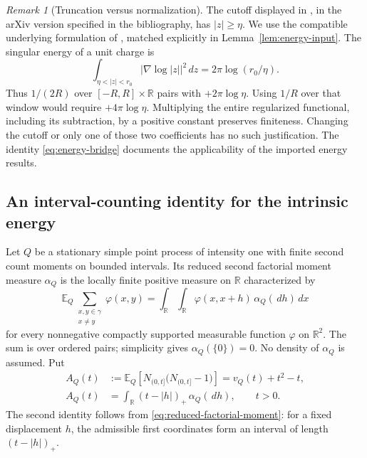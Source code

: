 \documentclass[11pt,reqno]{amsart}
\numberwithin{equation}{section}
\theoremstyle{definition}
\theoremstyle{remark}
\newtheorem{remark}[theorem]{Remark}
\newcommand{\R}{\mathbb R}
\newcommand{\E}{\mathbb E}
\newcommand{\1}{\mathbf 1}
\newcommand{\dd}{\,d}
\begin{document}
\begin{remark}[Truncation versus normalization]\label{rem:cutoff}
The cutoff displayed in \cite[Definition~2.20]{DHLM}, in the
arXiv version specified in the bibliography, has $|z|\ge\eta$.
We use the compatible underlying formulation of \cite{LS}, matched
explicitly in Lemma~\ref{lem:energy-input}.
The singular energy of a unit charge is
\[
\int_{\eta<|z|<r_0}|\nabla\log|z||^2\dd z
=2\pi\log(r_0/\eta).
\]
Thus $1/(2R)$ over $[-R,R]\times\R$ pairs with $+2\pi\log\eta$.
Using $1/R$ over that window would require $+4\pi\log\eta$.
Multiplying the entire regularized functional, including its
subtraction, by a positive constant preserves finiteness. Changing
the cutoff or only one of those two coefficients has no such
justification. The identity \eqref{eq:energy-bridge} documents the
applicability of the imported energy results.
\end{remark}

\subsection{An interval-counting identity for the intrinsic energy}

Let $Q$ be a stationary simple point process of intensity one with
finite second count moments on bounded intervals. Its reduced second
factorial moment measure $\alpha_Q$ is the locally finite positive
measure on $\R$ characterized by
\begin{equation}\label{eq:reduced-factorial-moment}
\E_Q\sum_{\substack{x,y\in\gamma\\x\ne y}}\varphi(x,y)
 =\int_\R\int_\R\varphi(x,x+h)\,\alpha_Q(\dd h)\dd x
\end{equation}
for every nonnegative compactly supported measurable function
$\varphi$ on $\R^2$. The sum is over ordered pairs; simplicity gives
$\alpha_Q(\{0\})=0$. No density of $\alpha_Q$ is assumed. Put
\begin{equation}\label{eq:factorial-count-overlap}
\begin{aligned}
A_Q(t)&:=\E_Q\!\left[N_{(0,t]}\bigl(N_{(0,t]}-1\bigr)\right]
       =v_Q(t)+t^2-t,\\
A_Q(t)&=\int_\R(t-|h|)_+\,\alpha_Q(\dd h),\qquad t>0.
\end{aligned}
\end{equation}
The second identity follows from \eqref{eq:reduced-factorial-moment}:
for a fixed displacement $h$, the admissible first coordinates form
an interval of length $(t-|h|)_+$.
\end{document}
